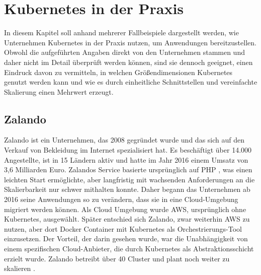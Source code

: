 \documentclass[11pt,a4paper]{article}
\begin{document}
\section{Kubernetes in der Praxis}
\label{sec:Fallbeispiele}
In diesem Kapitel soll anhand mehrerer Fallbeispiele dargestellt werden, wie Unternehmen
Kubernetes in der Praxis nutzen, um Anwendungen bereitzustellen.
Obwohl die aufgeführten Angaben direkt von den Unternehmen stammen und daher nicht im Detail
überprüft werden können, sind sie dennoch geeignet, einen Eindruck davon zu vermitteln,
in welchen Größendimensionen Kubernetes genutzt werden kann und wie es durch
einheitliche Schnittstellen und vereinfachte Skalierung
einen Mehrwert erzeugt.
\subsection{Zalando}
Zalando ist ein Unternehmen, das 2008 gegründet wurde und das sich auf den Verkauf
von Bekleidung im Internet spezialisiert hat. Es beschäftigt über 14.000 Angestellte,
ist in 15 Ländern aktiv und hatte im Jahr 2016 einem Umsatz von 3,6 Milliarden Euro.
Zalandos Service basierte ursprünglich auf PHP \cite{php}, was einen leichten Start ermöglichte,
aber langfristig mit wachsenden Anforderungen an die Skalierbarkeit nur schwer mithalten konnte.
Daher begann das Unternehmen ab 2016 seine Anwendungen so zu verändern, dass sie
in eine Cloud-Umgebung migriert werden können. Als Cloud Umgebung wurde AWS, %
ursprünglich ohne Kubernetes, ausgewählt. Später entschied sich Zalando,
zwar weiterhin AWS zu nutzen, aber dort Docker Container mit Kubernetes
als Orchestrierungs-Tool einzusetzen. Der Vorteil, der darin gesehen wurde,
war die Unabhängigkeit von einem spezifischen Cloud-Anbieter, die durch
Kubernetes als Abstraktionsschicht erzielt wurde.
Zalando betreibt über 40 Cluster und plant noch weiter zu skalieren \cite{story_zalando}.
\end{document}
